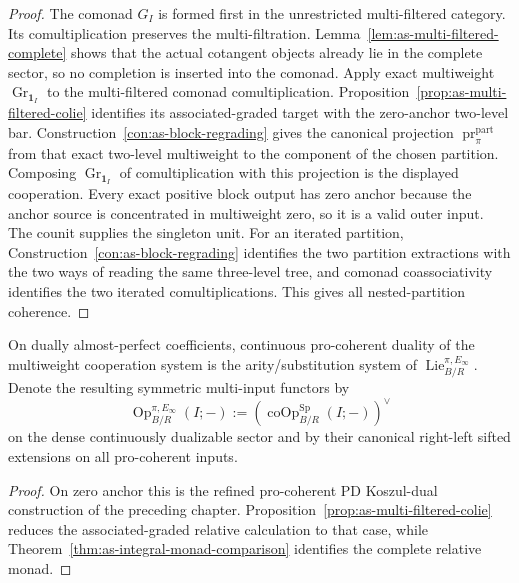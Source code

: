 \begin{proof}
The comonad $G_I$ is formed first in the unrestricted multi-filtered category.
Its comultiplication preserves the multi-filtration.
Lemma~\ref{lem:as-multi-filtered-complete} shows that the actual cotangent
objects already lie in the complete sector, so no completion is inserted into
the comonad.  Apply exact multiweight $\operatorname{Gr}_{\mathbf1_I}$ to the
multi-filtered comonad comultiplication.  Proposition~\ref{prop:as-multi-filtered-colie} identifies its associated-graded target with the zero-anchor
two-level bar.  Construction~\ref{con:as-block-regrading} gives the canonical
projection $\operatorname{pr}_{\pi}^{\mathrm{part}}$ from that exact
two-level multiweight to the component of the chosen partition.  Composing
$\operatorname{Gr}_{\mathbf1_I}$ of comultiplication with this projection is
the displayed cooperation.  Every exact positive block output has zero anchor
because the anchor source is concentrated in multiweight zero, so it is a
valid outer input.  The counit supplies the singleton unit.  For an iterated
partition, Construction~\ref{con:as-block-regrading} identifies the two
partition extractions with the two ways of reading the same three-level tree,
and comonad coassociativity identifies the two iterated comultiplications.
This gives all nested-partition coherence.
\end{proof}

\begin{corollary}
\label{cor:as-integral-pd-arity}
On dually almost-perfect coefficients, continuous pro-coherent duality of the
multiweight cooperation system is the arity/substitution system of
$\operatorname{Lie}^{\pi,E_\infty}_{B/R}$.  Denote the resulting symmetric
multi-input functors by
\[
\boxed{
    \operatorname{Op}^{\pi,E_\infty}_{B/R}(I;-)
    :=
    \left(
        \operatorname{coOp}^{\mathrm{Sp}}_{B/R}(I;-)
    \right)^\vee
}
\]
on the dense continuously dualizable sector and by their canonical right-left
sifted extensions on all pro-coherent inputs.
\end{corollary}

\begin{proof}
On zero anchor this is the refined pro-coherent PD Koszul-dual construction of
the preceding chapter.  Proposition~\ref{prop:as-multi-filtered-colie}
reduces the associated-graded relative calculation to that case, while
Theorem~\ref{thm:as-integral-monad-comparison} identifies the complete relative
monad.
\end{proof}

